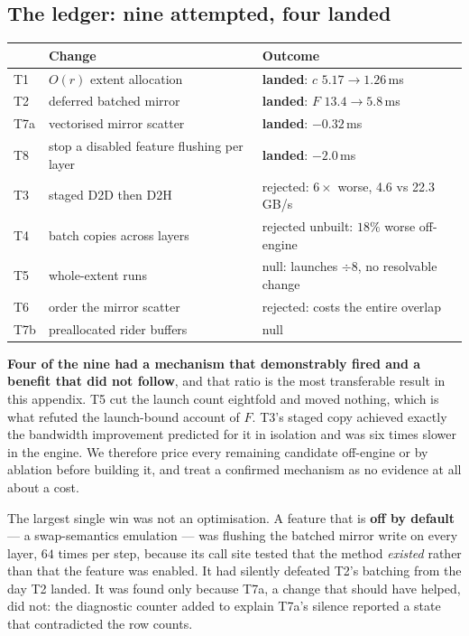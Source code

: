 \subsection{The ledger: nine attempted, four landed}

\begin{center}\small
\begin{tabular}{llp{4.6cm}}
\toprule
 & Change & Outcome \\
\midrule
T1 & $O(r)$ extent allocation   & \textbf{landed}: $c$ $5.17 \to 1.26$\,ms \\
T2 & deferred batched mirror    & \textbf{landed}: $F$ $13.4 \to 5.8$\,ms \\
T7a & vectorised mirror scatter & \textbf{landed}: $-0.32$\,ms \\
T8 & stop a disabled feature flushing per layer & \textbf{landed}: $-2.0$\,ms \\
T3 & staged D2D then D2H        & rejected: $6\times$ worse, 4.6 vs 22.3\,GB/s \\
T4 & batch copies across layers & rejected unbuilt: $18\%$ worse off-engine \\
T5 & whole-extent runs          & null: launches $\div 8$, no resolvable change \\
T6 & order the mirror scatter   & rejected: costs the entire overlap \\
T7b & preallocated rider buffers & null \\
\bottomrule
\end{tabular}
\end{center}

\textbf{Four of the nine had a mechanism that demonstrably fired and a benefit that
did not follow}, and that ratio is the most transferable result in this appendix. T5
cut the launch count eightfold and moved nothing, which is what refuted the
launch-bound account of $F$. T3's staged copy achieved exactly the bandwidth
improvement predicted for it in isolation and was six times slower in the engine. We
therefore price every remaining candidate off-engine or by ablation before building
it, and treat a confirmed mechanism as no evidence at all about a cost.

The largest single win was not an optimisation. A feature that is \textbf{off by
default} --- a swap-semantics emulation --- was flushing the batched mirror write on
every layer, $64$ times per step, because its call site tested that the method
\emph{existed} rather than that the feature was enabled. It had silently defeated
T2's batching from the day T2 landed. It was found only because T7a, a change that
should have helped, did not: the diagnostic counter added to explain T7a's silence
reported a state that contradicted the row counts.

